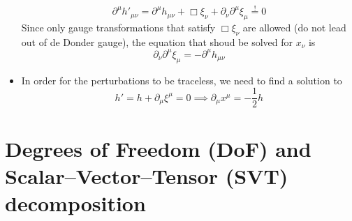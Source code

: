 \begin{itemize}
\begin{equation}
        \partial^\mu h'_{\mu\nu} = \partial^\mu h_{\mu\nu} + \Box \xi_\nu + \partial_\nu \partial^\mu \xi_\mu \overset{!}{=} 0
    \end{equation}
    Since only gauge transformations that satisfy $\Box \xi_\nu$ are allowed (do not lead out of de Donder gauge), the equation that shoud
    be solved for $x_\nu$ is
    \begin{equation}
        \partial_\nu \partial^\mu \xi_\mu = - \partial^\mu h_{\mu\nu}
    \end{equation}
    \item In order for the perturbations to be traceless, we need to find a solution to
    \begin{equation}
        h' = h + \partial_\mu \xi^\mu = 0 \implies \partial_\mu x^\mu = -\frac{1}{2}h
    \end{equation}
\end{itemize}

\section{Degrees of Freedom (DoF) and Scalar--Vector--Tensor (SVT) decomposition}